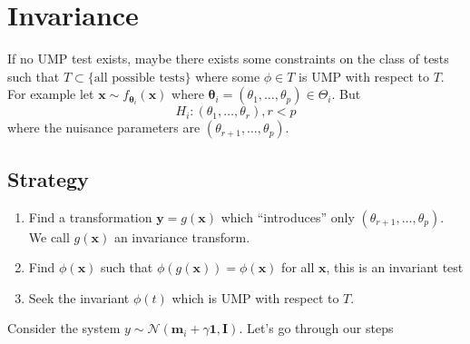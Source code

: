\documentclass[a4paper]{article}
\begin{document}
\section*{Invariance}%
If no UMP test exists, maybe there exists some constraints on the class of tests such that $T \subset \{ \text{all possible tests} \}$ where some $\phi \in T$ is UMP with respect to $T$. For example let $\bm{x} \sim f_{\bm{\theta}_i}(\bm{x})$ where $\bm{\theta}_i = (\theta_1, \dots, \theta_p) \in \Theta_i$. But 
\[
  H_i: (\theta_1, \dots, \theta_r), r < p
\]
where the nuisance parameters are $(\theta_{r+1}, \dots, \theta_p)$. 

\subsection*{Strategy}%

\begin{enumerate}
  \item 
Find a transformation $\bm{y} = g(\bm{x})$ which ``introduces'' only $(\theta_{r+1}, \dots, \theta_p)$. We call $g(\bm{x})$ an invariance transform. 
  \item Find $\phi(\bm{x})$ such that $\phi(g(\bm{x})) = \phi(\bm{x})$ for all $\bm{x}$, this is an invariant test
  \item Seek the invariant $\phi(t)$ which is UMP with respect to $T$.
\end{enumerate}
Consider the system $y \sim \mathcal{N}(\bm{m}_i + \gamma \bm{1}, \bm{I})$. Let's go through our steps
\end{document}
